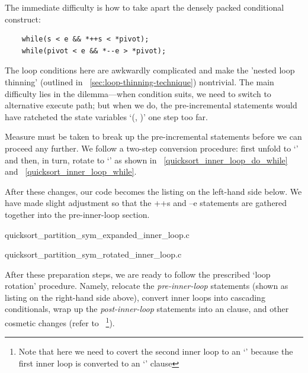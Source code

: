 The immediate difficulty is how to take apart the densely packed conditional construct:
\begin{lstlisting}
    while(s < e && *++s < *pivot);
    while(pivot < e && *--e > *pivot);
\end{lstlisting}
The loop conditions here are awkwardly complicated and make the 'nested loop thinning'
(outlined in ~\autoref{sec:loop-thinning-technique}) nontrivial.
The main difficulty lies in the dilemma---when condition suits, we need to switch to
alternative execute path;
but when we do, the pre-incremental statements would have ratcheted
the state variables `(, )' one step too far.


Measure must be taken to break up the pre-incremental statements before we can proceed any further.
We follow a two-step conversion procedure: first unfold to `' and then,
in turn, rotate to `' as shown in ~\autoref{quicksort_inner_loop_do_while} and
~\autoref{quicksort_inner_loop_while}.

\begin{minipage}[t]{.4\textwidth}
    
\end{minipage}\hfill
\begin{minipage}[t]{.4\textwidth}
    
\end{minipage}


After these changes, our code becomes the listing on the left-hand side below.
We have made slight adjustment so that the ++s and --e statements are gathered together into the
pre-inner-loop section.

\begin{minipage}[t]{.4\textwidth}
    
    {quicksort_partition_sym_expanded_inner_loop.c}
\end{minipage}\hfill
\begin{minipage}[t]{.4\textwidth}
    
    {quicksort_partition_sym_rotated_inner_loop.c}
\end{minipage}

After these preparation steps, we are ready to follow the prescribed `loop rotation' procedure.
Namely, relocate the \emph{pre-inner-loop} statements (shown as listing on the right-hand side
above),
convert inner loops into cascading conditionals, wrap up the \emph{post-inner-loop} statements
into an  clause, and other cosmetic changes (refer to
~\footnote{Note that here
we need to covert the second inner loop to an `' because the first inner loop is
converted to an `' clause}).


